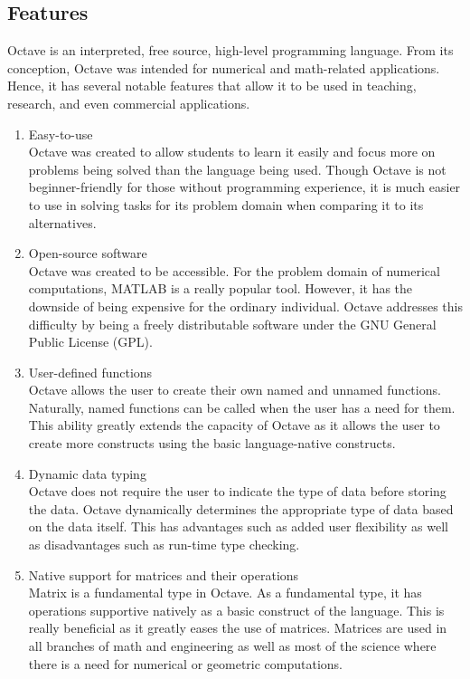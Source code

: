 \documentclass{article}
\begin{document}
\subsection*{Features}
\par
Octave is an interpreted, free source, high-level programming language. From its conception, Octave was intended for numerical and math-related applications. Hence, it has several notable features that allow it to be used in teaching, research, and even commercial applications.
\begin{enumerate}
    \item Easy-to-use\\
    Octave was created to allow students to learn it easily and focus more on problems being solved than the language being used. Though Octave is not beginner-friendly for those without programming experience, it is much easier to use in solving tasks for its problem domain when comparing it to its alternatives.

    \item Open-source software\\
    Octave was created to be accessible. For the problem domain of numerical computations, MATLAB is a really popular tool. However, it has the downside of being expensive for the ordinary individual. Octave addresses this difficulty by being a freely distributable software under the GNU General Public License (GPL).

    \item User-defined functions\\
    Octave allows the user to create their own named and unnamed functions. Naturally, named functions can be called when the user has a need for them. This ability greatly extends the capacity of Octave as it allows the user to create more constructs using the basic language-native constructs.

    \item Dynamic data typing\\
    Octave does not require the user to indicate the type of data before storing the data. Octave dynamically determines the appropriate type of data based on the data itself. This has advantages such as added user flexibility as well as disadvantages such as run-time type checking.

    \item Native support for matrices and their operations\\
    Matrix is a fundamental type in Octave. As a fundamental type, it has operations supportive natively as a basic construct of the language. This is really beneficial as it greatly eases the use of matrices. Matrices are used in all branches of math and engineering as well as most of the science where there is a need for numerical or geometric computations.


\end{enumerate}
\end{document}
